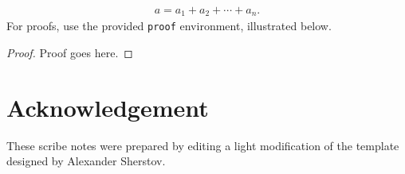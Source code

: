 \documentclass[usletter]{article}
\begin{document}
\noindent
\begin{align}
a = a_1+a_2+\cdots+a_n.
\end{align}
\noindent
For proofs, use the provided {\tt proof} environment,
illustrated below.

\begin{proof}
Proof goes here.
\end{proof}

\section*{Acknowledgement}
These scribe notes were prepared by editing a light modification of the template designed by Alexander Sherstov.



\end{document}
